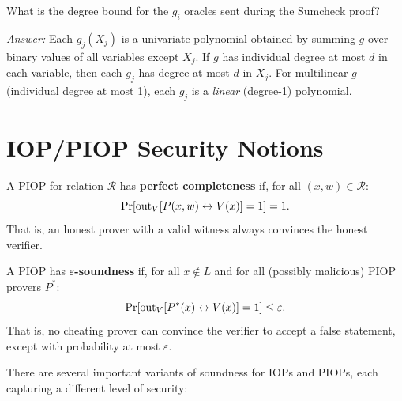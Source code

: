 \documentclass[11pt]{article}
\begin{document}
\begin{quizbox}
  What is the degree bound for the $g_i$ oracles sent during the Sumcheck proof?

  \medskip
  \textit{Answer:} Each $g_j(X_j)$ is a univariate polynomial obtained by
  summing $g$ over binary values of all variables except $X_j$. If $g$ has
  individual degree at most $d$ in each variable, then each $g_j$ has degree at
  most $d$ in $X_j$. For multilinear $g$ (individual degree at most 1), each
  $g_j$ is a \emph{linear} (degree-1) polynomial.
\end{quizbox}

\section{IOP/PIOP Security Notions}

\begin{defbox}
A PIOP for relation $\mathcal{R}$ has \textbf{perfect completeness} if, for all
$(x, w) \in \mathcal{R}$:
\[
  \Pr\!\left[\text{out}_V\!\left[P(x,w) \leftrightarrow V(x)\right] = 1\right] = 1.
\]
That is, an honest prover with a valid witness always convinces the honest
verifier.
\end{defbox}

\begin{defbox}
A PIOP has \textbf{$\varepsilon$-soundness} if, for all $x \notin L$ and for
all (possibly malicious) PIOP provers $P^*$:
\[
  \Pr\!\left[\text{out}_V\!\left[P^*(x) \leftrightarrow V(x)\right] = 1\right] \leq \varepsilon.
\]
That is, no cheating prover can convince the verifier to accept a false
statement, except with probability at most $\varepsilon$.
\end{defbox}

There are several important variants of soundness for IOPs and PIOPs,
each capturing a different level of security:
\end{document}
